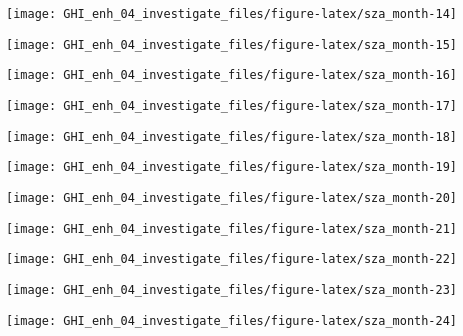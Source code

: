 \documentclass[
  10pt,
  a4paper,oneside]{article}
\begin{document}
\begin{center}\texttt{[image: GHI\_enh\_04\_investigate\_files/figure-latex/sza\_month-14]} \end{center}

\begin{center}\texttt{[image: GHI\_enh\_04\_investigate\_files/figure-latex/sza\_month-15]} \end{center}

\begin{center}\texttt{[image: GHI\_enh\_04\_investigate\_files/figure-latex/sza\_month-16]} \end{center}

\begin{center}\texttt{[image: GHI\_enh\_04\_investigate\_files/figure-latex/sza\_month-17]} \end{center}

\begin{center}\texttt{[image: GHI\_enh\_04\_investigate\_files/figure-latex/sza\_month-18]} \end{center}

\begin{center}\texttt{[image: GHI\_enh\_04\_investigate\_files/figure-latex/sza\_month-19]} \end{center}

\begin{center}\texttt{[image: GHI\_enh\_04\_investigate\_files/figure-latex/sza\_month-20]} \end{center}

\begin{center}\texttt{[image: GHI\_enh\_04\_investigate\_files/figure-latex/sza\_month-21]} \end{center}

\begin{center}\texttt{[image: GHI\_enh\_04\_investigate\_files/figure-latex/sza\_month-22]} \end{center}

\begin{center}\texttt{[image: GHI\_enh\_04\_investigate\_files/figure-latex/sza\_month-23]} \end{center}

\begin{center}\texttt{[image: GHI\_enh\_04\_investigate\_files/figure-latex/sza\_month-24]} \end{center}
\end{document}
